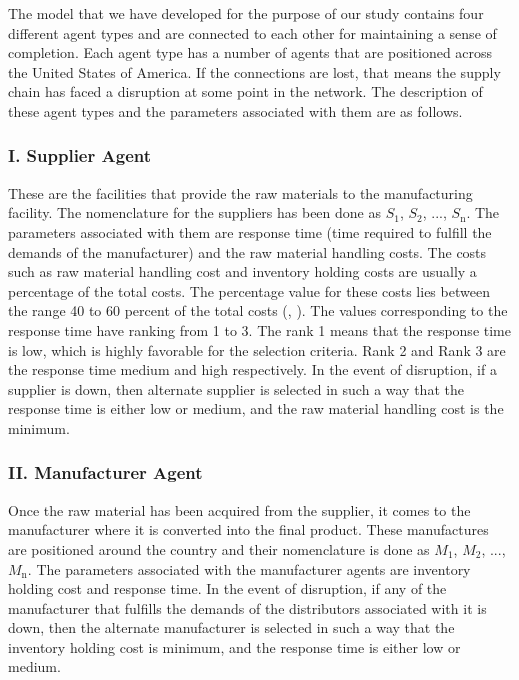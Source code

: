 The model that we have developed for the purpose of our study contains four different agent types and are connected to each other for maintaining a sense of completion. Each agent type has a number of agents that are positioned across the United States of America. If the connections are lost, that means the supply chain has faced a disruption at some point in the network. The description of these agent types and the parameters associated with them are as follows.

\subsubsection{I. Supplier Agent}

These are the facilities that provide the raw materials to the manufacturing facility. The nomenclature for the suppliers has been done as $S_{\text{1}}$, $S_{\text{2}}$, ..., $S_{\text{n}}$. The parameters associated with them are response time (time required to fulfill the demands of the manufacturer) and the raw material handling costs. The costs such as raw material handling cost and inventory holding costs are usually a percentage of the total costs. The percentage value for these costs lies between the range 40 to 60 percent of the total costs (\citeauthor{lee1992managing}, \citeyear{lee1992managing}).
The values corresponding to the response time have ranking from 1 to 3. The rank 1 means that the response time is low, which is highly favorable for the selection criteria. Rank 2 and Rank 3 are the response time medium and high respectively. In the event of disruption, if a supplier is down, then alternate supplier is selected in such a way that the response time is either low or medium, and the raw material handling cost is the minimum.

\subsubsection{II. Manufacturer Agent}

Once the raw material has been acquired from the supplier, it comes to the manufacturer where it is converted into the final product. These manufactures are positioned around the country and their nomenclature is done as $M_{\text{1}}$, $M_{\text{2}}$, ..., $M_{\text{n}}$. The parameters associated with the manufacturer agents are inventory holding cost and response time. In the event of disruption, if any of the manufacturer that fulfills the demands of the distributors associated with it is down, then the alternate manufacturer is selected in such a way that the inventory holding cost is minimum, and the response time is either low or medium. 

